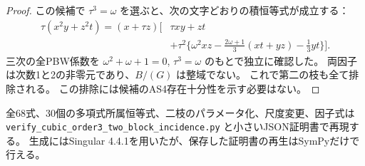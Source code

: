 \begin{proof}
この候補で $\tau^3=\omega$ を選ぶと、次の文字どおりの積恒等式が成立する：
\[
\begin{aligned}
 \tau(x^2y+z^2t)=(x+\tau z)\bigl[&\tau xy+zt\\
 &+\tau^2\{\omega^2xz-\tfrac{2\omega+1}{3}(xt+yz)-\tfrac13yt\}\bigr].
\end{aligned}
\]
三次の全PBW係数を $\omega^2+\omega+1=0$, $\tau^3=\omega$ のもとで独立に確認した。
両因子は次数1と2の非零元であり、$B/(G)$ は整域でない。
これで第二の枝も全て排除される。
この排除には候補のAS4存在十分性を示す必要はない。
\end{proof}
全68式、30個の多項式所属恒等式、二枝のパラメータ化、尺度変更、因子式は
\texttt{verify\_\allowbreak{}cubic\_\allowbreak{}order3\_\allowbreak{}two\_\allowbreak{}block\_\allowbreak{}incidence.py}
と小さいJSON証明書で再現する。
生成にはSingular 4.4.1を用いたが、保存した証明書の再生はSymPyだけで行える。

